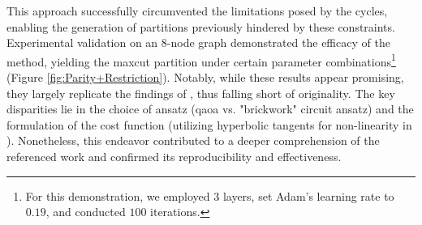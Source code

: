 This approach successfully circumvented the limitations posed by the cycles, enabling the generation of partitions previously hindered by these constraints. Experimental validation on an $8$-node graph demonstrated the efficacy of the method, yielding the \acrshort{maxcut} partition under certain parameter combinations\footnote{For this demonstration, we employed $3$ layers, set Adam's learning rate to $0.19$, and conducted $100$ iterations.} (Figure \ref{fig:Parity+Restriction}). Notably, while these results appear promising, they largely replicate the findings of \cite{sciorilli2024largescale}, thus falling short of originality. The key disparities lie in the choice of ansatz (\acrshort{qaoa} vs. "brickwork" circuit ansatz) and the formulation of the cost function (utilizing hyperbolic tangents for non-linearity in \cite{sciorilli2024largescale}). Nonetheless, this endeavor contributed to a deeper comprehension of the referenced work and confirmed its reproducibility and effectiveness.

